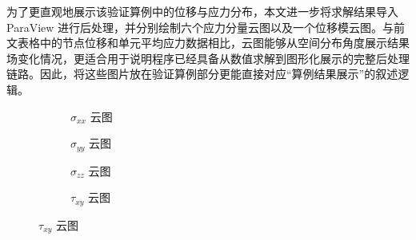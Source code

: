 \documentclass[12pt,a4paper]{article}
\begin{document}
为了更直观地展示该验证算例中的位移与应力分布，本文进一步将求解结果导入 ParaView 进行后处理，并分别绘制六个应力分量云图以及一个位移模云图。与前文表格中的节点位移和单元平均应力数据相比，云图能够从空间分布角度展示结果场变化情况，更适合用于说明程序已经具备从数值求解到图形化展示的完整后处理链路。因此，将这些图片放在验证算例部分更能直接对应“算例结果展示”的叙述逻辑。

\begin{figure}[htbp]
\centering
\begin{subfigure}[t]{0.47\textwidth}
\centering
%
\caption{$\sigma_{xx}$ 云图}
\label{fig:h8_sigma_xx}
\end{subfigure}
\hfill
\begin{subfigure}[t]{0.47\textwidth}
\centering
%
\caption{$\sigma_{yy}$ 云图}
\label{fig:h8_sigma_yy}
\end{subfigure}

\vspace{0.8em}

\begin{subfigure}[t]{0.47\textwidth}
\centering
%
\caption{$\sigma_{zz}$ 云图}
\label{fig:h8_sigma_zz}
\end{subfigure}
\hfill
\begin{subfigure}[t]{0.47\textwidth}
\centering
%
\caption{$\tau_{xy}$ 云图}
\label{fig:h8_tau_xy}
\end{subfigure}

\vspace{0.8em}


\end{figure}
\end{document}
